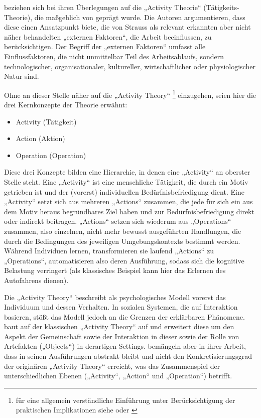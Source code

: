 \citet{Fjuk97} beziehen sich bei ihren Überlegungen auf die „Activity Theorie“ (Tätigkeits-Theorie), die maßgeblich von \citet{Leontev72} geprägt wurde. Die Autoren argumentieren, dass diese einen Ansatzpunkt biete, die von Strauss als relevant erkannten aber nicht näher behandelten „externen Faktoren“, die Arbeit beeinflussen, zu berücksichtigen. Der Begriff der „externen Faktoren“ umfasst alle Einflussfaktoren, die nicht unmittelbar Teil des Arbeitsablaufs, sondern technologischer, organisationaler, kultureller, wirtschaftlicher oder physiologischer Natur sind. 

Ohne an dieser Stelle näher auf die „Activity Theory“ \footnote{für eine allgemein verständliche Einführung unter Berücksichtigung der praktischen Implikationen siehe \citet{Dahme97} oder \citet{Nardi06}} einzugehen, seien hier die drei Kernkonzepte der Theorie erwähnt:
\begin{itemize}
	\item Activity (Tätigkeit)
	\item Action (Aktion)
	\item Operation (Operation)
\end{itemize}

Diese drei Konzepte bilden eine Hierarchie, in denen eine „Activity“ an oberster Stelle steht. Eine „Activity“ ist eine menschliche Tätigkeit, die durch ein Motiv getrieben ist und der (vorerst) individuellen Bedürfnisbefriedigung dient. Eine „Activity“ setzt sich aus mehreren „Actions“ zusammen, die jede für sich ein aus dem Motiv heraus begründbares Ziel haben und zur Bedürfnisbefriedigung direkt oder indirekt beitragen. „Actions“ setzen sich wiederum aus „Operations“ zusammen, also einzelnen, nicht mehr bewusst ausgeführten Handlungen, die durch die Bedingungen des jeweiligen Umgebungskontexts bestimmt werden. Während Individuen lernen, transformieren sie laufend „Actions“ zu „Operations“, automatisieren also deren Ausführung, sodass sich die kognitive Belastung verringert (als klassisches Beispiel kann hier das Erlernen des Autofahrens dienen).

Die „Activity Theory“ beschreibt als psychologisches Modell vorerst das Individuum und dessen Verhalten. In sozialen Systemen, die auf Interaktion basieren, stößt das Modell jedoch an die Grenzen der erklärbaren Phänomene. \citet{Engestrom87} baut auf der klassischen „Activity Theory“ auf und erweitert diese um den Aspekt der Gemeinschaft sowie der Interaktion in dieser sowie der Rolle von Artefakten („Objects“) in derartigen Settings. \citet{Fjuk97} bemängeln aber in ihrer Arbeit, dass \citeauthor{Engestrom87} in seinen Ausführungen abstrakt bleibt und nicht den Konkretisierungsgrad der originären „Activity Theory“ erreicht, was das Zusammenspiel der unterschiedlichen Ebenen („Activity“, „Action“ und „Operation“) betrifft.

